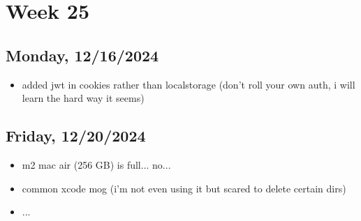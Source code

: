 \newpage
\section{Week 25}

\subsection{Monday, 12/16/2024}
\begin{itemize}
    \item added jwt in cookies rather than localstorage (don't roll your own
        auth, i will learn the hard way it seems)
\end{itemize}

\subsection{Friday, 12/20/2024}
\begin{itemize}
    \item m2 mac air (256 GB) is full... no...
    \item common xcode mog (i'm not even using it but scared to delete certain
        dirs)
    \item ...
\end{itemize}
